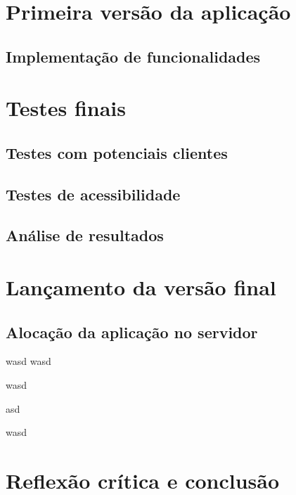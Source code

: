 \documentclass[11pt, twoside]{report}
\begin{document}
	\chapter{Primeira versão da aplicação}
	\section{Implementação de funcionalidades}
	
	\chapter{Testes finais}
	\section{Testes com potenciais clientes}
	\section{Testes de acessibilidade}
	\section{Análise de resultados}
	
	\chapter{Lançamento da versão final}
	\section{Alocação da aplicação no servidor}
	
	\pagebreak
	wasd
	wasd
	
	
	wasd
	
	
	\pagebreak
	
	asd
	
	wasd
	\chapter{Reflexão crítica e conclusão}
	
	

	
	
	
\end{document}
